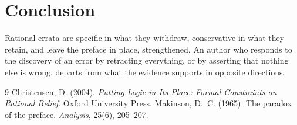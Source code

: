 \documentclass{situationist-preprint}
\begin{document}
\section{Conclusion}

Rational errata are specific in what they withdraw, conservative in what they retain, and leave the preface in place, strengthened. An author who responds to the discovery of an error by retracting everything, or by asserting that nothing else is wrong, departs from what the evidence supports in opposite directions.

\begin{thebibliography}{9}\small
{} Christensen, D. (2004). \emph{Putting Logic in Its Place: Formal Constraints on Rational Belief}. Oxford University Press.
 Makinson, D.~C. (1965). The paradox of the preface. \emph{Analysis}, 25(6), 205--207.
\end{thebibliography}
\end{document}

